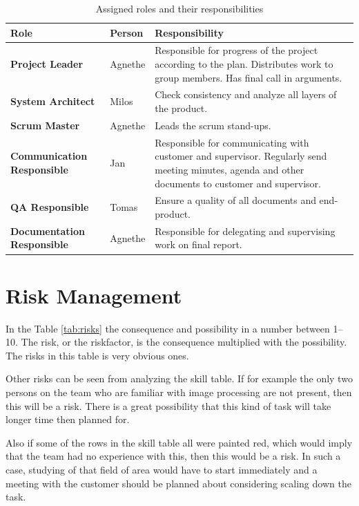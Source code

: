\begin{table}\centering {}
    \caption{Assigned roles and their responsibilities}
    \label{tab:roles}
    \vspace{2mm}
    \begin{tabularx}{\textwidth}{llX}
    \toprule[0.5mm]
    Role    & Person   & Responsibility \\
    \midrule
    \textbf{Project Leader}             & Agnethe &
        Responsible for progress of the project according to the plan.
        Distributes work to group members.
        Has final call in arguments.\\
    \textbf{System Architect}             & Milos &
        Check consistency and analyze all layers of the product. \\
    \textbf{Scrum Master}             & Agnethe &
        Leads the scrum stand-ups. \\
    \textbf{Communication Responsible}  & Jan &
        Responsible for communicating with customer and supervisor.
        Regularly send meeting minutes, agenda and other documents to customer and supervisor. \\ 
    \textbf{QA Responsible} & Tomas &
        Ensure a quality of all documents and end-product.        \\ 
    \textbf{Documentation Responsible} & Agnethe &
        Responsible for delegating and supervising work on final report.        \\         
    \bottomrule[0.5mm]
    \end{tabularx}
\end{table}

\section{Risk Management}
In the Table \ref{tab:risks} the consequence and possibility in a number between 1--10. The risk, or the riskfactor, is the consequence multiplied with the possibility. The risks in this table is very obvious ones. 

Other risks can be seen from analyzing the skill table. If for example the only two persons on the team who are familiar with image processing are not present, then this will be a risk. There is a great possibility that this kind of task will take longer time then planned for. 

Also if some of the rows in the skill table all were painted red, which  would imply that the team had no experience with this, then this would be a risk. 
In such a case, studying of that field of area would have to start immediately and a meeting with the customer should be planned about considering scaling down the task.

